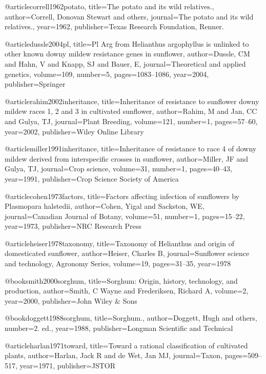 {@article{correll1962potato,
  title={The potato and its wild relatives.},
  author={Correll, Donovan Stewart and others},
  journal={The potato and its wild relatives.},
  year={1962},
  publisher={Texas Research Foundation, Renner.}
}

@article{dussle2004pl,
  title={Pl Arg from Helianthus argophyllus is unlinked to other known downy mildew resistance genes in sunflower},
  author={Dussle, CM and Hahn, V and Knapp, SJ and Bauer, E},
  journal={Theoretical and applied genetics},
  volume={109},
  number={5},
  pages={1083--1086},
  year={2004},
  publisher={Springer}
}

@article{rahim2002inheritance,
  title={Inheritance of resistance to sunflower downy mildew races 1, 2 and 3 in cultivated sunflower},
  author={Rahim, M and Jan, CC and Gulya, TJ},
  journal={Plant Breeding},
  volume={121},
  number={1},
  pages={57--60},
  year={2002},
  publisher={Wiley Online Library}
}

@article{miller1991inheritance,
  title={Inheritance of resistance to race 4 of downy mildew derived from interspecific crosses in sunflower},
  author={Miller, JF and Gulya, TJ},
  journal={Crop science},
  volume={31},
  number={1},
  pages={40--43},
  year={1991},
  publisher={Crop Science Society of America}
}

@article{cohen1973factors,
  title={Factors affecting infection of sunflowers by Plasmopara halstedii},
  author={Cohen, Yigal and Sackston, WE},
  journal={Canadian Journal of Botany},
  volume={51},
  number={1},
  pages={15--22},
  year={1973},
  publisher={NRC Research Press}
}

@article{heiser1978taxonomy,
  title={Taxonomy of Helianthus and origin of domesticated sunflower},
  author={Heiser, Charles B},
  journal={Sunflower science and technology, Agronomy Series},
  volume={19},
  pages={31--35},
  year={1978}
}

@book{smith2000sorghum,
  title={Sorghum: Origin, history, technology, and production},
  author={Smith, C Wayne and Frederiksen, Richard A},
  volume={2},
  year={2000},
  publisher={John Wiley \& Sons}
}

@book{doggett1988sorghum,
  title={Sorghum.},
  author={Doggett, Hugh and others},
  number={2. ed.},
  year={1988},
  publisher={Longman Scientific and Technical}
}

@article{harlan1971toward,
  title={Toward a rational classification of cultivated plants},
  author={Harlan, Jack R and de Wet, Jan MJ},
  journal={Taxon},
  pages={509--517},
  year={1971},
  publisher={JSTOR}
}

}
